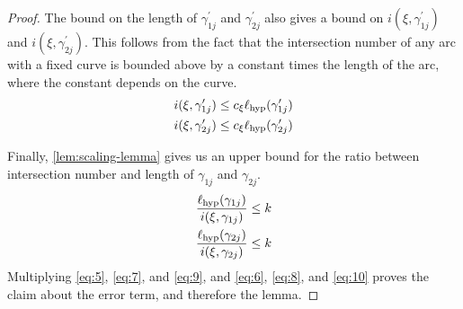 \documentclass[12pt, reqno]{amsart}
\begin{document}
\begin{proof}
  The bound on the length of $\gamma_{1j}^{\prime}$ and $\gamma_{2j}^{\prime}$ also gives a bound on $i(\xi, \gamma_{1j}^{\prime})$ and $i(\xi, \gamma_{2j}^{\prime})$.
  This follows from the fact that the intersection number of any arc with a fixed curve is bounded above by a constant times the length of the arc, where the constant depends on the curve.
  \begin{align}
    \label{eq:7}
    i(\xi, \gamma_{1j}^{\prime}) &\leq c_\xi \ell_{\mathrm{hyp}}(\gamma_{1j}^{\prime}) \\
    \label{eq:8}
    i(\xi, \gamma_{2j}^{\prime}) &\leq c_\xi \ell_{\mathrm{hyp}}(\gamma_{2j}^{\prime}) \\
  \end{align}

  Finally, \autoref{lem:scaling-lemma} gives us an upper bound for the ratio between intersection number and length of $\gamma_{1j}$ and $\gamma_{2j}$.
  \begin{align}
    \label{eq:9}
    \frac{\ell_{\mathrm{hyp}}(\gamma_{1j})}{i(\xi, \gamma_{1j})} &\leq k \\
    \label{eq:10}
    \frac{\ell_{\mathrm{hyp}}(\gamma_{2j})}{i(\xi, \gamma_{2j})} &\leq k \\
  \end{align}
  Multiplying \eqref{eq:5}, \eqref{eq:7}, and \eqref{eq:9}, and \eqref{eq:6}, \eqref{eq:8}, and \eqref{eq:10} proves the claim about the error term, and therefore the lemma.
\end{proof}
\end{document}
